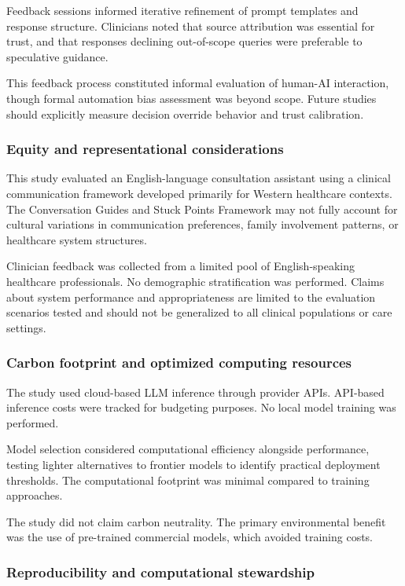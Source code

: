 Feedback sessions informed iterative refinement of prompt templates and response structure. Clinicians noted that source attribution was essential for trust, and that responses declining out-of-scope queries were preferable to speculative guidance.

This feedback process constituted informal evaluation of human-AI interaction, though formal automation bias assessment was beyond scope. Future studies should explicitly measure decision override behavior and trust calibration.

\subsubsection{Equity and representational considerations}

This study evaluated an English-language consultation assistant using a clinical communication framework developed primarily for Western healthcare contexts. The Conversation Guides and Stuck Points Framework may not fully account for cultural variations in communication preferences, family involvement patterns, or healthcare system structures.

Clinician feedback was collected from a limited pool of English-speaking healthcare professionals. No demographic stratification was performed. Claims about system performance and appropriateness are limited to the evaluation scenarios tested and should not be generalized to all clinical populations or care settings.

\subsubsection{Carbon footprint and optimized computing resources}

The study used cloud-based LLM inference through provider APIs. API-based inference costs were tracked for budgeting purposes. No local model training was performed.

Model selection considered computational efficiency alongside performance, testing lighter alternatives to frontier models to identify practical deployment thresholds. The computational footprint was minimal compared to training approaches.

The study did not claim carbon neutrality. The primary environmental benefit was the use of pre-trained commercial models, which avoided training costs.

\subsubsection{Reproducibility and computational stewardship}

